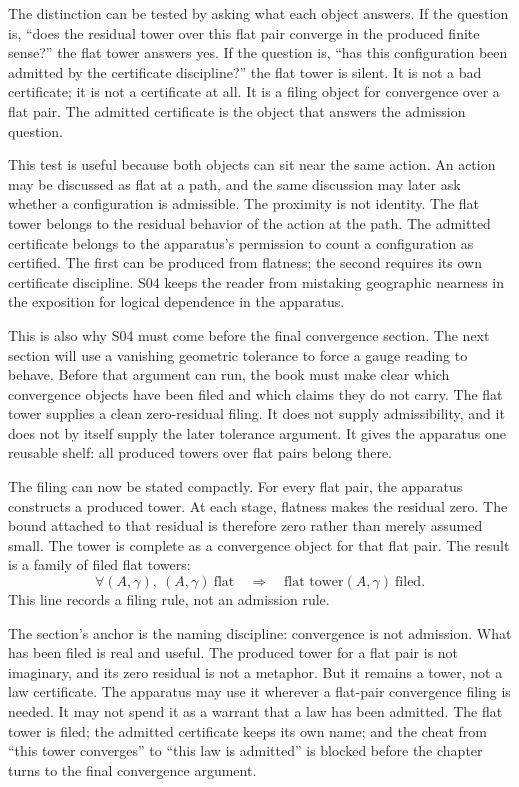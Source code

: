 The distinction can be tested by asking what each object answers. If the
question is, ``does the residual tower over this flat pair converge in the
produced finite sense?'' the flat tower answers yes. If the question is, ``has
this configuration been admitted by the certificate discipline?'' the flat
tower is silent. It is not a bad certificate; it is not a certificate at all.
It is a filing object for convergence over a flat pair. The admitted
certificate is the object that answers the admission question.

This test is useful because both objects can sit near the same action. An
action may be discussed as flat at a path, and the same discussion may later
ask whether a configuration is admissible. The proximity is not identity. The
flat tower belongs to the residual behavior of the action at the path. The
admitted certificate belongs to the apparatus's permission to count a
configuration as certified. The first can be produced from flatness; the
second requires its own certificate discipline. S04 keeps the reader from
mistaking geographic nearness in the exposition for logical dependence in the
apparatus.

This is also why S04 must come before the final convergence section. The next
section will use a vanishing geometric tolerance to force a gauge reading to
behave. Before that argument can run, the book must make clear which
convergence objects have been filed and which claims they do not carry. The
flat tower supplies a clean zero-residual filing. It does not supply
admissibility, and it does not by itself supply the later tolerance argument.
It gives the apparatus one reusable shelf: all produced towers over flat pairs
belong there.

The filing can now be stated compactly. For every flat pair, the apparatus
constructs a produced tower. At each stage, flatness makes the residual zero.
The bound attached to that residual is therefore zero rather than merely
assumed small. The tower is complete as a convergence object for that flat
pair. The result is a family of filed flat towers:
\[
  \forall (A,\gamma),\ 
  (A,\gamma)\ \text{flat}
  \quad\Longrightarrow\quad
  \text{flat tower}(A,\gamma)\ \text{filed}.
\]
This line records a filing rule, not an admission rule.

The section's anchor is the naming discipline: convergence is not admission.
What has been filed is real and useful. The produced tower for a flat pair is
not imaginary, and its zero residual is not a metaphor. But it remains a tower,
not a law certificate. The apparatus may use it wherever a flat-pair
convergence filing is needed. It may not spend it as a warrant that a law has been
admitted. The flat tower is filed; the admitted certificate keeps its own name;
and the cheat from ``this tower converges'' to ``this law is admitted'' is
blocked before the chapter turns to the final convergence argument.

